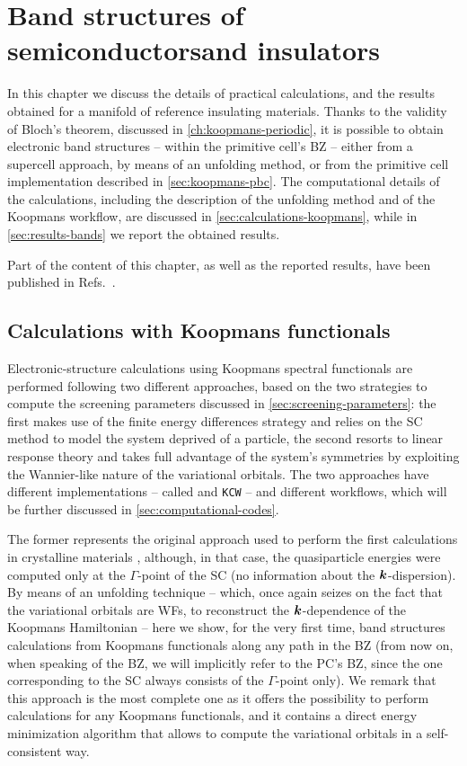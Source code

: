 \cleardoublepage
\chapter[Band structures of semiconductors and insulators]{Band structures of semiconductors\break and insulators\label{ch:band-structures}}
In this chapter we discuss the details of practical calculations, and the results obtained for a manifold of reference insulating materials. Thanks to the validity of Bloch's theorem, discussed in \cref{ch:koopmans-periodic}, it is possible to obtain electronic band structures -- within the primitive cell's BZ -- either from a supercell approach, by means of an unfolding method, or from the primitive cell implementation described in \cref{sec:koopmans-pbc}. The computational details of the calculations, including the description of the unfolding method and of the Koopmans workflow, are discussed in \cref{sec:calculations-koopmans}, while in \cref{sec:results-bands} we report the obtained results.

Part of the content of this chapter, as well as the reported results, have been published in Refs.~\cite{de_gennaro_blochs_2022,colonna_koopmans_2022}.

\clearpage
\section{Calculations with Koopmans functionals\label{sec:calculations-koopmans}}
Electronic-structure calculations using Koopmans spectral functionals are performed following two different approaches, based on the two strategies to compute the screening parameters discussed in \cref{sec:screening-parameters}: the first makes use of the finite energy differences strategy and relies on the SC method to model the system deprived of a particle, the second resorts to linear response theory and takes full advantage of the system's symmetries by exploiting the Wannier-like nature of the variational orbitals. The two approaches have different implementations -- called \kcp and \texttt{KCW} -- and different workflows, which will be further discussed in \cref{sec:computational-codes}.

The former represents the original approach used to perform the first calculations in crystalline materials \cite{nguyen_koopmans-compliant_2018}, although, in that case, the quasiparticle energies were computed only at the $\Gamma$-point of the SC (no information about the ${\bm k}$-dispersion). By means of an unfolding technique -- which, once again seizes on the fact that the variational orbitals are WFs, to reconstruct the ${\bm k}$-dependence of the Koopmans Hamiltonian -- here we show, for the very first time, band structures calculations from Koopmans functionals along any path in the BZ \cite{de_gennaro_blochs_2022} (from now on, when speaking of the BZ, we will implicitly refer to the PC's BZ, since the one corresponding to the SC always consists of the $\Gamma$-point only). We remark that this approach is the most complete one as it offers the possibility to perform calculations for any Koopmans functionals, and it contains a direct energy minimization algorithm that allows to compute the variational orbitals in a self-consistent way.

